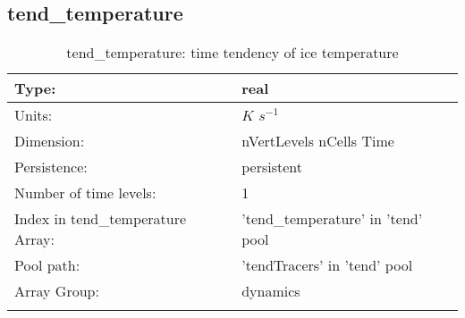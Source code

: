 \subsection[tend\_temperature]{tend\_temperature}
\label{subsec:var_sec_tend_tend_temperature}
\begin{center}
\begin{longtable}{| p{2.0in} | p{4.0in} |}
        \hline 
        Type: & real \\
        \hline 
        Units: & $K$ $s^{-1}$ \\
        \hline 
        Dimension: & nVertLevels nCells Time \\
        \hline 
        Persistence: & persistent \\
        \hline 
        Number of time levels: & 1 \\
        \hline 
		 Index in tend\_temperature Array: & 'tend\_temperature' in 'tend' pool \\
		 \hline 
            Pool path: & 'tendTracers' in 'tend' pool
 \\
		 \hline 
		 Array Group: & dynamics \\
		 \hline 
    \caption{tend\_temperature: time tendency of ice temperature}
\end{longtable}
\end{center}
